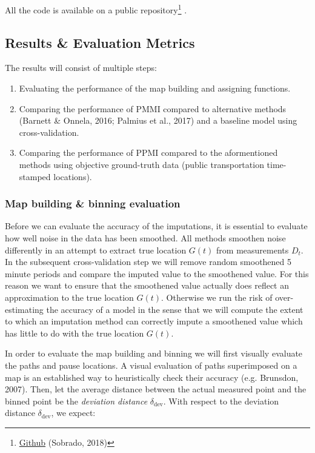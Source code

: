 \documentclass[man]{apa6}
\providecommand{\tightlist}{%
  \setlength{\itemsep}{0pt}\setlength{\parskip}{0pt}}
\theoremstyle{definition}
\theoremstyle{definition}
\theoremstyle{definition}
\theoremstyle{remark}
\begin{document}
All the code is available on a public repository\footnote{\href{https://github.com/sobradob/thesis}{Github}
  (Sobrado, 2018)} .

\subsection{Results \& Evaluation
Metrics}\label{results-evaluation-metrics}

The results will consist of multiple steps:

\begin{enumerate}
\def\labelenumi{\arabic{enumi}.}
\tightlist
\item
  Evaluating the performance of the map building and assigning
  functions.
\item
  Comparing the performance of PMMI compared to alternative methods
  (Barnett \& Onnela, 2016; Palmius et al., 2017) and a baseline model
  using cross-validation.
\item
  Comparing the performance of PPMI compared to the aformentioned
  methods using objective ground-truth data (public transportation
  time-stamped locations).
\end{enumerate}

\subsubsection{Map building \& binning
evaluation}\label{map-building-binning-evaluation}

Before we can evaluate the accuracy of the imputations, it is essential
to evaluate how well noise in the data has been smoothed. All methods
smoothen noise differently in an attempt to extract true location
\(G(t)\) from measurements \(D_t\). In the subsequent cross-validation
step we will remove random smoothened 5 minute periods and compare the
imputed value to the smoothened value. For this reason we want to ensure
that the smoothened value actually does reflect an approximation to the
true location \(G(t)\). Otherwise we run the risk of over-estimating the
accuracy of a model in the sense that we will compute the extent to
which an imputation method can correctly impute a smoothened value which
has little to do with the true location \(G(t)\).

In order to evaluate the map building and binning we will first visually
evaluate the paths and pause locations. A visual evaluation of paths
superimposed on a map is an established way to heuristically check their
accuracy (e.g. Brunsdon, 2007). Then, let the average distance between
the actual measured point and the binned point be the \emph{deviation
distance} \(\delta_{\text{dev}}\). With respect to the deviation
distance \(\delta_{\text{dev}}\), we expect:
\end{document}
